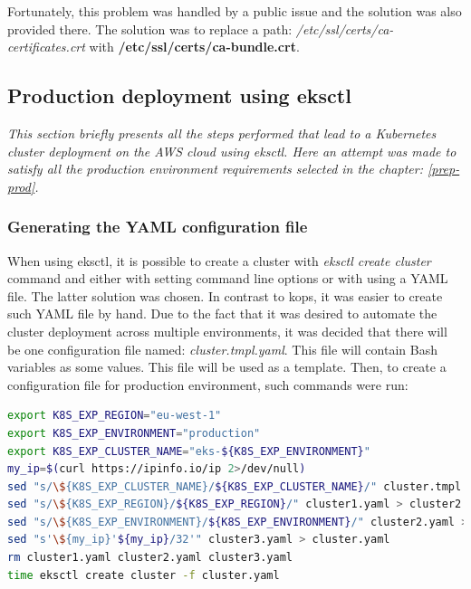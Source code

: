 Fortunately, this problem was handled by a public issue and the solution was also provided there\cite{as-github-issue}. The solution was to replace a path: \textit{/etc/ssl/certs/ca-certificates.crt} with \textbf{/etc/ssl/certs/ca-bundle.crt}.



\subsection{Production deployment using eksctl}
\textit{This section briefly presents all the steps performed that lead to a Kubernetes cluster deployment on the AWS cloud using eksctl. Here an attempt was made to satisfy all the production environment requirements selected in the chapter: \ref{prep-prod}.}
\\

\subsubsection{Generating the YAML configuration file}
When using eksctl, it is possible to create a cluster with \textit{eksctl create cluster} command and either with setting command line options or with using a YAML file. The latter solution was chosen. In contrast to kops, it was easier to create such YAML file by hand. Due to the fact that it was desired to automate the cluster deployment across multiple environments, it was decided that there will be one configuration file named: \textit{cluster.tmpl.yaml}. This file will contain Bash variables as some values. This file will be used as a template. Then, to create a configuration file for production environment, such commands were run:
\begin{lstlisting}[basicstyle=\tiny,caption={TODO},captionpos=b,language=Bash,xleftmargin=1cm]
export K8S_EXP_REGION="eu-west-1"
export K8S_EXP_ENVIRONMENT="production"
export K8S_EXP_CLUSTER_NAME="eks-${K8S_EXP_ENVIRONMENT}"
my_ip=$(curl https://ipinfo.io/ip 2>/dev/null)
sed "s/\${K8S_EXP_CLUSTER_NAME}/${K8S_EXP_CLUSTER_NAME}/" cluster.tmpl.yaml > cluster1.yaml
sed "s/\${K8S_EXP_REGION}/${K8S_EXP_REGION}/" cluster1.yaml > cluster2.yaml
sed "s/\${K8S_EXP_ENVIRONMENT}/${K8S_EXP_ENVIRONMENT}/" cluster2.yaml > cluster3.yaml
sed "s'\${my_ip}'${my_ip}/32'" cluster3.yaml > cluster.yaml
rm cluster1.yaml cluster2.yaml cluster3.yaml
time eksctl create cluster -f cluster.yaml
\end{lstlisting}


